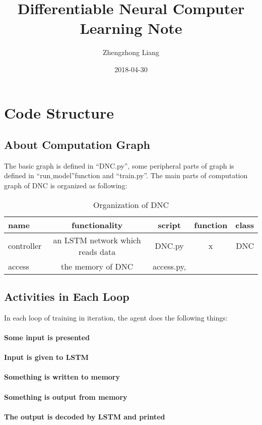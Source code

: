 \documentclass{article}
\title{Differentiable Neural Computer Learning Note}
\author{Zhengzhong Liang}
\date{2018-04-30}
\begin{document}
\maketitle
\section{Code Structure}
\subsection{About Computation Graph}
The basic graph is defined in ``DNC.py'', some peripheral parts of graph is defined in ``run$\_$model''function and ``train.py''. The main parts of computation graph of DNC is organized as following:
\begin{table}
\centering
\caption{Organization of DNC}
\begin{tabular}{| l | c | c | c | r |} \hline
name & functionality & script & function & class \\ \hline
controller & an LSTM network which reads data & DNC.py & x & DNC \\ \hline
access & the memory of DNC & access.py, 
\end{tabular}
\end{table}

\subsection{Activities in Each Loop}
In each loop of training in iteration, the agent does the following things: 
\paragraph{Some input is presented}
\paragraph{Input is given to LSTM}
\paragraph{Something is written to memory}
\paragraph{Something is output from memory}
\paragraph{The output is decoded by LSTM and printed}
\end{document}
